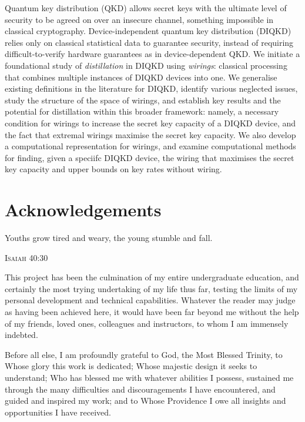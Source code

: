 \documentclass[10pt, a4paper]{article}
\numberwithin{equation}{section} %
\theoremstyle{definition}
\theoremstyle{plain}
\newcommand{\?}{\mathrel{?}} %
\begin{document}
    Quantum key distribution (QKD) allows secret keys with the ultimate level of security to be agreed on over an insecure channel, something impossible in classical cryptography. Device-independent quantum key distribution (DIQKD) relies only on classical statistical data to guarantee security, instead of requiring difficult-to-verify hardware guarantees as in device-dependent QKD\@. We initiate a foundational study of \emph{distillation} in DIQKD using \emph{wirings}: classical processing that combines multiple instances of DIQKD devices into one. We generalise existing definitions in the literature for DIQKD, identify various neglected issues, study the structure of the space of wirings, and establish key results and the potential for distillation within this broader framework: namely, a necessary condition for wirings to increase the secret key capacity of a DIQKD device, and the fact that extremal wirings maximise the secret key capacity. We also develop a computational representation for wirings, and examine computational methods for finding, given a speciifc DIQKD device, the wiring that maximises the secret key capacity and upper bounds on key rates without wiring.

    \clearpage

    \section*{Acknowledgements}
    \epigraph{Youths grow tired and weary, the young stumble and fall.}{\textsc{Isaiah} 40:30}

    This project has been the culmination of my entire undergraduate education, and certainly the most trying undertaking of my life thus far, testing the limits of my personal development and technical capabilities. Whatever the reader may judge as having been achieved here, it would have been far beyond me without the help of my friends, loved ones, colleagues and instructors, to whom I am immensely indebted.

    Before all else, I am profoundly grateful to God, the Most Blessed Trinity, to Whose glory this work is dedicated; Whose majestic design it seeks to understand; Who has blessed me with whatever abilities I possess, sustained me through the many difficulties and discouragements I have encountered, and guided and inspired my work; and to Whose Providence I owe all insights and opportunities I have received.
\end{document}
